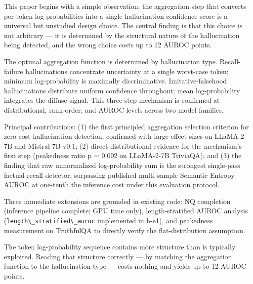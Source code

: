 
This paper begins with a simple observation: the aggregation step that converts per-token log-probabilities into a single hallucination confidence score is a universal but unstudied design choice. The central finding is that this choice is not arbitrary --- it is determined by the structural nature of the hallucination being detected, and the wrong choice costs up to 12 AUROC points.

The optimal aggregation function is determined by hallucination type. Recall-failure hallucinations concentrate uncertainty at a single worst-case token; minimum log-probability is maximally discriminative. Imitative-falsehood hallucinations distribute uniform confidence throughout; mean log-probability integrates the diffuse signal. This three-step mechanism is confirmed at distributional, rank-order, and AUROC levels across two model families.

Principal contributions: (1) the first principled aggregation selection criterion for zero-cost hallucination detection, confirmed with large effect sizes on LLaMA-2-7B and Mistral-7B-v0.1; (2) direct distributional evidence for the mechanism's first step (peakedness ratio p = 0.002 on LLaMA-2-7B TriviaQA); and (3) the finding that raw unnormalized log-probability sum is the strongest single-pass factual-recall detector, surpassing published multi-sample Semantic Entropy AUROC at one-tenth the inference cost under this evaluation protocol.

Three immediate extensions are grounded in existing code: NQ completion (inference pipeline complete; GPU time only), length-stratified AUROC analysis (\texttt{length\textbackslash \_stratified\textbackslash \_auroc} implemented in h-e1), and peakedness measurement on TruthfulQA to directly verify the flat-distribution assumption.

The token log-probability sequence contains more structure than is typically exploited. Reading that structure correctly --- by matching the aggregation function to the hallucination type --- costs nothing and yields up to 12 AUROC points.

